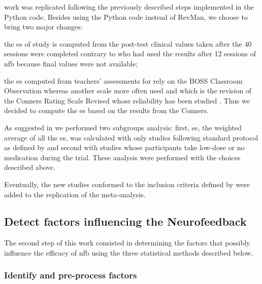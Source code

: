 \citeauthor{Cortese2016} work was replicated following the previously described steps implemented in the Python code. Besides using the Python 
code instead of RevMan, we choose to bring two major changes:
\begin{description}
\item the \gls{es} of \citeauthor{Arnold2014} study is computed from the post-test clinical values taken after the 40 sessions were completed 
contrary to \citet{Cortese2016} who had used the results after 12 sessions of \gls{nfb} because final values were not available;
\item the \gls{es} computed from teachers' assessments for \citet{Steiner2014} rely on the BOSS Classroom Observation \citep{Shapiro2010} whereas 
another scale more often used \citep{Christiansen2014, Bluschke2016} and which is the revision of the Conners Rating Scale Revised \citep{Conners1998} 
whose reliability has been studied \citep{Collett2003}. Thus we decided to compute the \gls{es} based on the results from the Conners.  
\end{description} 

As suggested in \citet{Cortese2016} we performed two subgroups analysis: first, \gls{se}, the weighted average of all the \gls{es}, was calculated with only studies following 
standard protocol as defined by \citet{Arns2014} and second with studies whose participants take low-dose or no medication during the trial. 
These analysis were performed with the choices described above. 

Eventually, the new studies conformed to the inclusion criteria defined by \citeauthor{Cortese2016} were added to the replication of the meta-analysis. 

\subsection{Detect factors influencing the Neurofeedback}

The second step of this work consisted in determining the factors that possibly influence the efficacy of \gls{nfb} using the three statistical
 methods described below. 

\subsubsection{Identify and pre-process factors}

